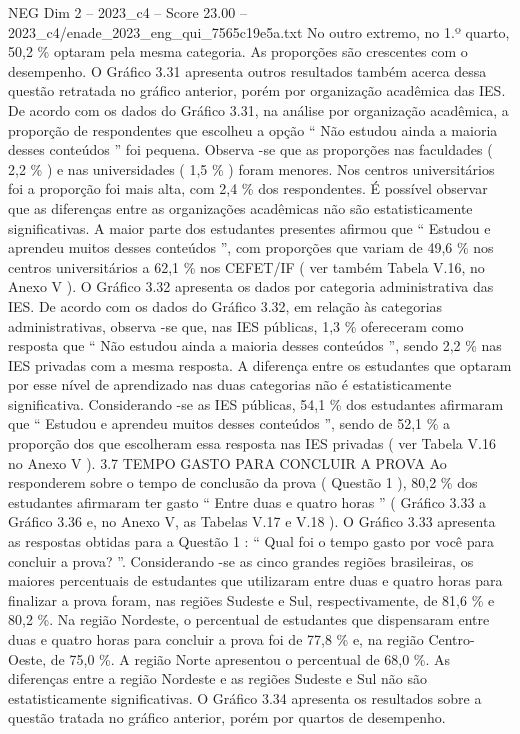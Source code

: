 \begin{textsample}{NEG Dim 2 – 2023\_c4 – Score 23.00 – 2023\_c4/enade\_2023\_eng\_qui\_7565c19e5a.txt}
No outro extremo, no 1.º quarto, 50,2 \% optaram pela mesma categoria.
As proporções são crescentes com o desempenho.
O Gráfico 3.31 apresenta outros resultados também acerca dessa questão retratada no gráfico anterior, porém por organização acadêmica das IES.
De acordo com os dados do Gráfico 3.31, na análise por organização acadêmica, a proporção de respondentes que escolheu a opção “ Não estudou ainda a maioria desses conteúdos ” foi pequena.
Observa -se que as proporções nas faculdades ( 2,2 \% ) e nas universidades ( 1,5 \% ) foram menores.
Nos centros universitários foi a proporção foi mais alta, com 2,4 \% dos respondentes.
É possível observar que as diferenças entre as organizações acadêmicas não são estatisticamente significativas.
A maior parte dos estudantes presentes afirmou que “ Estudou e aprendeu muitos desses conteúdos ”, com proporções que variam de 49,6 \% nos centros universitários a 62,1 \% nos CEFET/IF ( ver também Tabela V.16, no Anexo V ).
O Gráfico 3.32 apresenta os dados por categoria administrativa das IES.
De acordo com os dados do Gráfico 3.32, em relação às categorias administrativas, observa -se que, nas IES públicas, 1,3 \% ofereceram como resposta que “ Não estudou ainda a maioria desses conteúdos ”, sendo 2,2 \% nas IES privadas com a mesma resposta.
A diferença entre os estudantes que optaram por esse nível de aprendizado nas duas categorias não é estatisticamente significativa.
Considerando -se as IES públicas, 54,1 \% dos estudantes afirmaram que “ Estudou e aprendeu muitos desses conteúdos ”, sendo de 52,1 \% a proporção dos que escolheram essa resposta nas IES privadas ( ver Tabela V.16 no Anexo V ). 3.7 TEMPO GASTO PARA CONCLUIR A PROVA Ao responderem sobre o tempo de conclusão da prova ( Questão 1 ), 80,2 \% dos estudantes afirmaram ter gasto “ Entre duas e quatro horas ” ( Gráfico 3.33 a Gráfico 3.36 e, no Anexo V, as Tabelas V.17 e V.18 ).
O Gráfico 3.33 apresenta as respostas obtidas para a Questão 1 : “ Qual foi o tempo gasto por você para concluir a prova? ”.
Considerando -se as cinco grandes regiões brasileiras, os maiores percentuais de estudantes que utilizaram entre duas e quatro horas para finalizar a prova foram, nas regiões Sudeste e Sul, respectivamente, de 81,6 \% e 80,2 \%.
Na região Nordeste, o percentual de estudantes que dispensaram entre duas e quatro horas para concluir a prova foi de 77,8 \% e, na região Centro-Oeste, de 75,0 \%.
A região Norte apresentou o percentual de 68,0 \%.
As diferenças entre a região Nordeste e as regiões Sudeste e Sul não são estatisticamente significativas.
O Gráfico 3.34 apresenta os resultados sobre a questão tratada no gráfico anterior, porém por quartos de desempenho.

\end{textsample}
